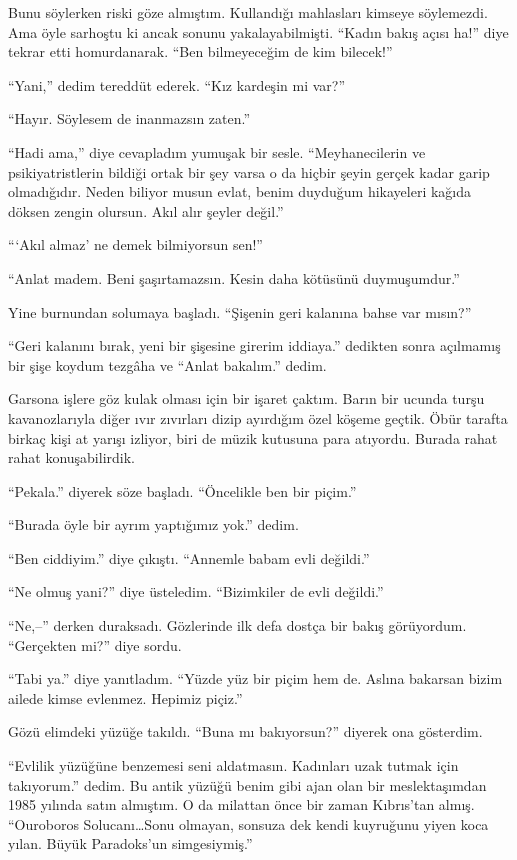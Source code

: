 Bunu söylerken riski göze almıştım. Kullandığı mahlasları kimseye söylemezdi.
Ama öyle sarhoştu ki ancak sonunu yakalayabilmişti. ``Kadın bakış açısı ha!''
diye tekrar etti homurdanarak. ``Ben bilmeyeceğim de kim bilecek!''

``Yani,'' dedim tereddüt ederek. ``Kız kardeşin mi var?''

``Hayır. Söylesem de inanmazsın zaten.''

``Hadi ama,'' diye cevapladım yumuşak bir sesle. ``Meyhanecilerin ve
psikiyatristlerin bildiği ortak bir şey varsa o da hiçbir şeyin gerçek kadar
garip olmadığıdır. Neden biliyor musun evlat, benim duyduğum hikayeleri kağıda
döksen zengin olursun. Akıl alır şeyler değil.''

```Akıl almaz' ne demek bilmiyorsun sen!''

``Anlat madem. Beni şaşırtamazsın. Kesin daha kötüsünü duymuşumdur.''

Yine burnundan solumaya başladı. ``Şişenin geri kalanına bahse var mısın?''

``Geri kalanını bırak, yeni bir şişesine girerim iddiaya.'' dedikten sonra
açılmamış bir şişe koydum tezgâha ve ``Anlat bakalım.'' dedim.

Garsona işlere göz kulak olması için bir işaret çaktım. Barın bir ucunda turşu
kavanozlarıyla diğer ıvır zıvırları dizip ayırdığım özel köşeme geçtik. Öbür
tarafta birkaç kişi at yarışı izliyor, biri de müzik kutusuna para atıyordu.
Burada rahat rahat konuşabilirdik.

``Pekala.'' diyerek söze başladı. ``Öncelikle ben bir piçim.''

``Burada öyle bir ayrım yaptığımız yok.'' dedim.

``Ben ciddiyim.'' diye çıkıştı. ``Annemle babam evli değildi.''

``Ne olmuş yani?'' diye üsteledim. ``Bizimkiler de evli değildi.''

``Ne,--'' derken duraksadı. Gözlerinde ilk defa dostça bir bakış görüyordum.
``Gerçekten mi?'' diye sordu.

``Tabi ya.'' diye yanıtladım. ``Yüzde yüz bir piçim hem de. Aslına bakarsan
bizim ailede kimse evlenmez. Hepimiz piçiz.''

Gözü elimdeki yüzüğe takıldı. ``Buna mı bakıyorsun?'' diyerek ona gösterdim.

``Evlilik yüzüğüne benzemesi seni aldatmasın. Kadınları uzak tutmak için
takıyorum.'' dedim.  Bu antik yüzüğü benim gibi ajan olan bir meslektaşımdan
1985 yılında satın almıştım. O da milattan önce bir zaman Kıbrıs'tan almış.
``Ouroboros Solucanı\dots Sonu olmayan, sonsuza dek kendi kuyruğunu yiyen koca
yılan. Büyük Paradoks'un simgesiymiş.''

